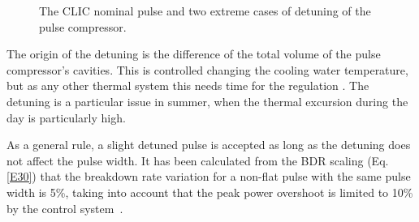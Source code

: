  
\begin{figure}[h]
\centering
{}
\hspace{2mm}
\caption{The CLIC nominal pulse and two extreme cases of detuning of the pulse compressor.}
\label{detuning_fig}
\end{figure}
 



The origin of the detuning is the difference of the total volume of the pulse compressor's cavities. This is controlled changing the cooling water temperature, but as any other thermal system this needs time for the regulation \cite{Woolley:CWS2016}. The detuning is a particular issue in summer, when the thermal excursion during the day is particularly high.

As a general rule, a slight detuned pulse is accepted as long as the detuning does not affect the pulse width. It has been calculated from the BDR scaling (Eq. \ref{E30}) that the breakdown rate variation for a non-flat pulse with the same pulse width is 5\%, taking into account that the peak power overshoot is limited to 10\% by the control system~\cite{Frank:PC}.  

